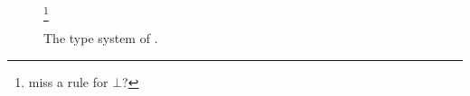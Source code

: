 
\begin{figure}


  \footnote{miss a rule for $\bot$?}


  \caption{The type system of \name.}
  \label{fig:fi-type}
\end{figure}





